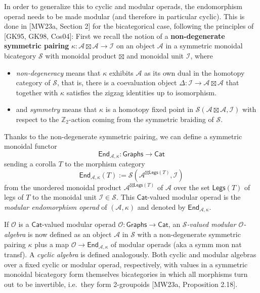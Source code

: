 \documentclass[11pt]{article}
\theoremstyle{definition}
\begin{document}
In order to generalize this to cyclic and modular operads, the endomorphism operad needs to be made modular (and therefore in particular cyclic). This is done in [MW23a, Section 2] for the bicategorical case, following the principles of [GK95, GK98, Cos04]: First we recall the notion of a \textbf{non-degenerate symmetric pairing} $\kappa : \mathcal{A} \boxtimes \mathcal{A} \to \mathcal{I}$ on an object $\mathcal{A}$ in a symmetric monoidal bicategory $\mathcal{S}$ with monoidal product $\boxtimes$ and monoidal unit $\mathcal{I}$, where
\begin{itemize}
    \item \textit{non-degeneracy} means that $\kappa$ exhibits $\mathcal{A}$ as its own dual in the homotopy category of $\mathcal{S}$, that is, there is a coevaluation object $\Delta : \mathcal{I} \to \mathcal{A} \boxtimes \mathcal{A}$ that together with $\kappa$ satisfies the zigzag identities up to isomorphism. 
    \item and \textit{symmetry} means that $\kappa$ is a homotopy fixed point in $\mathcal{S}(\mathcal{A} \boxtimes \mathcal{A}, \mathcal{I})$ with respect to the $\mathbb{Z}_2$-action coming from the symmetric braiding of $\mathcal{S}$.
\end{itemize}
Thanks to the non-degenerate symmetric pairing, we can define a symmetric monoidal functor $$\mathsf{End}_{\mathcal{A}, \kappa}: \mathsf{Graphs} \to \mathsf{Cat}$$ sending a corolla $T$ to the morphism category 
\begin{equation}\label{eq:End_Ak}
\mathsf{End}_{\mathcal{A}, \kappa}(T):=\mathcal{S}(\mathcal{A}^{\boxtimes \mathsf{Legs}(T)}, \mathcal{I})
\end{equation}
from the unordered monoidal product $\mathcal{A}^{\boxtimes \mathsf{Legs}(T)}$ of $\mathcal{A}$ over the set $\mathsf{Legs}(T)$ of legs of $T$ to the monoidal unit $\mathcal{I} \in \mathcal{S}$. This $\mathsf{Cat}$-valued modular operad is the \textit{modular endomorphism operad} of $(\mathcal{A}, \kappa)$ and denoted by $\mathsf{End}_{\mathcal{A}, \kappa}$.

If $\mathcal{O}$ is a $\mathsf{Cat}$-valued modular operad $\mathcal{O} :\mathsf{Graphs} \to \mathsf{Cat}$, an \textit{$\mathcal{S}$-valued  modular $\mathcal{O}$-algebra}  is now defined as an object $\mathcal{A}$ in $\mathcal{S}$  with a non-degenerate symmetric pairing $\kappa$ plus a map $\mathcal{O} \to \mathsf{End}_{\mathcal{A}, \kappa}$ of modular operads (aka a symm mon nat transf). A \textit{cyclic algebra} is defined analogously. Both cyclic and modular algebras over a fixed cyclic or modular operad, respectively, with values in a symmetric monoidal bicategory form themselves bicategories in which all morphisms turn out to be invertible, i.e.\ they form 2-groupoids [MW23a, Proposition 2.18].
\end{document}
